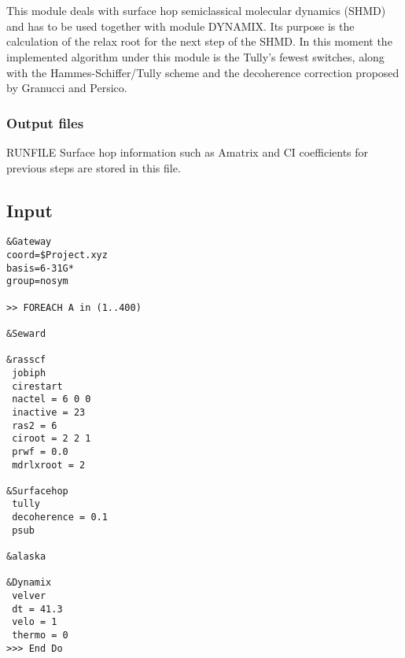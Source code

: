 
\section{}
\label{UG:sec:surfacehop}
This module deals with surface hop semiclassical molecular dynamics (SHMD) and has to be used together with module DYNAMIX. Its purpose is the calculation of the relax root for the next step of the SHMD. In this moment the implemented algorithm under this module is the Tully's fewest switches\cite{Tully1990}, along with the Hammes-Schiffer/Tully scheme\cite{Hammes-Schiffer1994} and the decoherence correction proposed by Granucci and Persico\cite{Granucci2007}.

\subsubsection{Output files}
\label{UG:sec:surfacehop_output_files}

\begin{filelist}
\item[RUNFILE]
Surface hop information such as Amatrix and CI coefficients for previous steps are stored in this file.
\end{filelist}

\subsection{Input}
\label{UG:sec:surfacehop_inp}
\begin{verbatim}
&Gateway
coord=$Project.xyz
basis=6-31G*
group=nosym

>> FOREACH A in (1..400)

&Seward

&rasscf
 jobiph
 cirestart
 nactel = 6 0 0
 inactive = 23
 ras2 = 6
 ciroot = 2 2 1
 prwf = 0.0
 mdrlxroot = 2

&Surfacehop
 tully
 decoherence = 0.1
 psub

&alaska

&Dynamix
 velver
 dt = 41.3
 velo = 1
 thermo = 0
>>> End Do
\end{verbatim}


